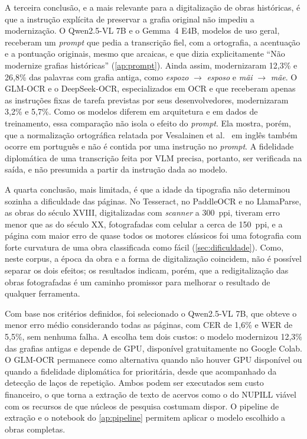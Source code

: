 \documentclass[noabntexcite,oneside]{ufsc-thesis-rn46-2019}
\begin{document}
A terceira conclusão, e a mais relevante para a digitalização de obras históricas, é que
a instrução explícita de preservar a grafia original não impediu a modernização. O
Qwen2.5-VL 7B e o Gemma~4 E4B, modelos de uso geral, receberam um \textit{prompt} que pedia
a transcrição fiel, com a ortografia, a acentuação e a pontuação originais, mesmo que
arcaicas, e que dizia explicitamente ``Não modernize grafias históricas''
(\autoref{ap:prompt}). Ainda assim, modernizaram 12,3\% e 26,8\% das palavras
com grafia antiga, como \textit{espozo} $\to$ \textit{esposo} e \textit{mãi} $\to$
\textit{mãe}. O GLM-OCR e o DeepSeek-OCR, especializados em OCR e que receberam apenas as
instruções fixas de tarefa previstas por seus desenvolvedores, modernizaram 3,2\% e 5,7\%.
Como os modelos diferem em arquitetura e em dados de treinamento, essa comparação não isola
o efeito do \textit{prompt}. Ela mostra, porém, que a normalização ortográfica relatada por
Vesalainen et al.\ \cite{vesalainen2025} em inglês também ocorre em português e não é
contida por uma instrução no \textit{prompt}. A fidelidade diplomática de uma transcrição
feita por VLM precisa, portanto, ser verificada na saída, e não presumida a partir da
instrução dada ao modelo.

A quarta conclusão, mais limitada, é que a idade da tipografia não determinou sozinha a
dificuldade das páginas. No Tesseract, no PaddleOCR e no LlamaParse, as obras do século
XVIII, digitalizadas com \textit{scanner} a 300~ppi, tiveram erro menor que as do século
XX, fotografadas com celular a cerca de 150~ppi, e a página com maior erro de quase todos
os motores clássicos foi uma fotografia com forte curvatura de uma obra classificada como
fácil (\autoref{sec:dificuldade}). Como, neste corpus, a época da obra e a forma de
digitalização coincidem, não é possível separar os dois efeitos; os resultados indicam,
porém, que a redigitalização das obras fotografadas é um caminho promissor para melhorar o
resultado de qualquer ferramenta.

Com base nos critérios definidos, foi selecionado o Qwen2.5-VL 7B, que obteve o menor erro
médio considerando todas as páginas, com CER de 1,6\% e WER de 5,5\%, sem nenhuma falha. A
escolha tem dois custos: o modelo modernizou 12,3\% das grafias antigas e depende de GPU,
disponível gratuitamente no Google Colab. O GLM-OCR permanece como alternativa quando não
houver GPU disponível ou quando a fidelidade diplomática for prioritária, desde que
acompanhado da detecção de laços de repetição. Ambos podem ser executados sem custo
financeiro, o que torna a extração de texto de acervos como o do NUPILL viável com os
recursos de que núcleos de pesquisa costumam dispor. O pipeline de extração e o notebook
do \autoref{ap:pipeline} permitem aplicar o modelo escolhido a obras completas.
\end{document}
